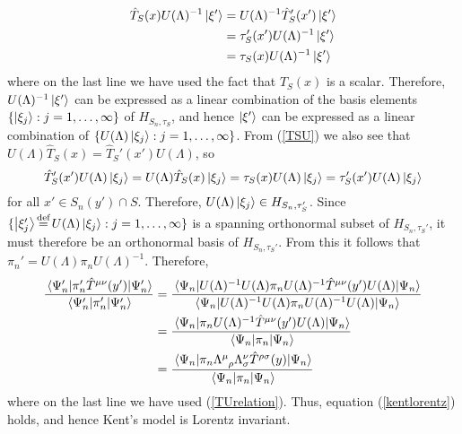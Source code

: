\begin{equation}\label{TSUxi}
\begin{split}
\hat{T}_S(x)U(\Lambda)^{-1}\ket{\xi'}&= U(\Lambda)^{-1} \hat{T}_S'(x')\ket{\xi'}\\
&=\tau_S'(x')U(\Lambda)^{-1}\ket{\xi'}\\
&=\tau_S(x)U(\Lambda)^{-1}\ket{\xi'}
\end{split}
\end{equation}
where on the last line we have used the fact that $T_S(x)$ is a scalar. Therefore, $U(\Lambda)^{-1}\ket{\xi'}$ can be expressed as a linear combination of the basis elements $\{\ket{\xi_j}:j=1,\ldots,\infty\}$ of $H_{S_n,\tau_S}$, and hence  $\ket{\xi'}$  can be expressed as a linear combination of $\{U(\Lambda)\ket{\xi_j}:j=1,\ldots,\infty\}$. From (\ref{TSU}) we also see that  $U(\Lambda)\hat{T}_S(x)=\hat{T}_S'(x')U(\Lambda)$, so
$$
\hat{T}_S'(x')U(\Lambda)\ket{\xi_j}=U(\Lambda)\hat{T}_S(x)\ket{\xi_j}=\tau_S(x)U(\Lambda)\ket{\xi_j}=\tau_S'(x')U(\Lambda)\ket{\xi_j}
$$
for all $x'\in S_n(y')\cap S$. Therefore, $U(\Lambda)\ket{\xi_j}\in H_{S_n,\tau_S'}$.
Since $\{\ket{\xi_j'}\myeq U(\Lambda)\ket{\xi_j}:j=1,\ldots,\infty\}$ is a spanning orthonormal subset of $H_{S_n,\tau_S'}$, it must therefore be an orthonormal basis of $H_{S_n,\tau_S'}$. From this it follows that $\pi_n'=U(\Lambda)\pi_nU(\Lambda)^{-1}$. Therefore, 
\begin{equation}\label{kentlorentz2}
\begin{split}
\frac{\ev{\pi_n'\hat{T}^{\mu\nu}(y')}{\Psi_n'}}{\ev{\pi_n'}{\Psi_n'}}&=\frac{\ev{U(\Lambda)^{-1}U(\Lambda)\pi_nU(\Lambda)^{-1}\hat{T}^{\mu\nu}(y')U(\Lambda)}{\Psi_n}}{\ev{U(\Lambda)^{-1}U(\Lambda)\pi_n U(\Lambda)^{-1}U(\Lambda)}{\Psi_n}}\\
&=\frac{\ev{\pi_nU(\Lambda)^{-1}\hat{T}^{\mu\nu}(y')U(\Lambda)}{\Psi_n}}{\ev{\pi_n}{\Psi_n}}\\
&=\frac{\ev{\pi_n\Lambda\indices{^\mu_\rho}\Lambda{^\nu_\sigma}\hat{T}^{\rho\sigma}(y)}{\Psi_n}}{\ev{\pi_n }{\Psi_n}}
\end{split}
\end{equation}
where on the last line we have used (\ref{TUrelation}). Thus, equation (\ref{kentlorentz}) holds, and hence Kent's model is Lorentz invariant.


